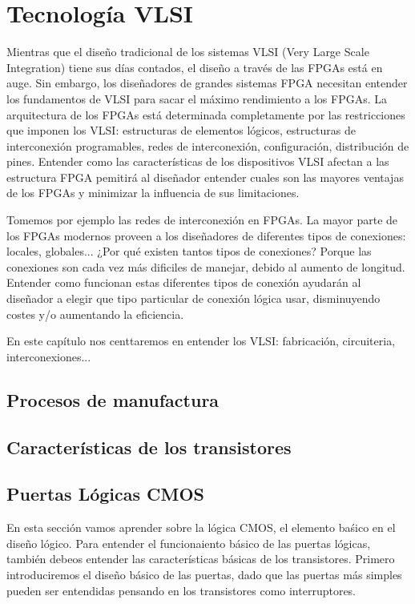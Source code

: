  \chapter{Tecnología VLSI}

Mientras que el diseño tradicional de los sistemas VLSI (Very Large Scale Integration) tiene sus días contados, el diseño a través de las FPGAs está en auge. Sin embargo, los diseñadores de grandes sistemas FPGA necesitan entender los fundamentos de VLSI para sacar el máximo rendimiento a los FPGAs. La arquitectura de los FPGAs está determinada completamente por las restricciones que imponen los VLSI: estructuras de elementos lógicos, estructuras de interconexión programables, redes de interconexión, configuración, distribución de pines. Entender como las características de los dispositivos VLSI afectan a las estructura FPGA pemitirá al diseñador entender cuales son las mayores ventajas de los FPGAs y minimizar la influencia de sus limitaciones. 

Tomemos por ejemplo las redes de interconexión en FPGAs. La mayor parte de los FPGAs modernos proveen a los diseñadores de diferentes tipos de conexiones: locales, globales... ¿Por qué existen tantos tipos de conexiones? Porque las conexiones son cada vez más dificiles de manejar, debido al aumento de longitud. Entender como funcionan estas diferentes tipos de conexión ayudarán al diseñador a elegir que tipo particular de conexión lógica usar, disminuyendo costes y/o aumentando la eficiencia. 

En este capítulo nos centtaremos en entender los VLSI: fabricación, circuiteria, interconexiones... 

\section{Procesos de manufactura}

\section{Características de los transistores}

\section{Puertas Lógicas CMOS}

En esta sección vamos aprender sobre la lógica CMOS, el elemento baśico en el diseño lógico. Para entender el funcionaiento básico de las puertas lógicas, también debeos entender las características básicas de los transistores. Primero introduciremos el diseño básico de las puertas, dado que las puertas más simples pueden ser entendidas pensando en los transistores como interruptores. 


